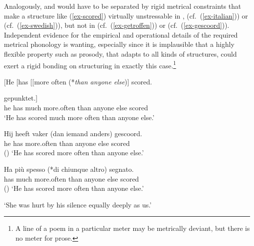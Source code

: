 \documentclass[output=paper
  ,nobabel
  ,uniformtopskip %
]{langscibook}
\begin{document}
\label{ex-muchsmaller}

\label{ex-building}
\zl

\largerpage[2]
\noindent
Analogously,  and  would have to be separated by rigid metrical constraints that make a structure like (\ref{ex-scored}) virtually unstressable in ,  (cf.\ (\ref{ex-italian})) or  (cf.\ (\ref{ex-swedish})), but not in  (cf.\ (\ref{ex-getroffen})) or  (cf.\ (\ref{ex-gescoord})). Independent evidence for the empirical and operational details of the required metrical phonology is wanting, especially since it is implausible that a highly flexible property such as prosody, that adapts to all kinds of structures, could exert a rigid bonding on structuring in exactly this case.\footnote{A line of a poem in a particular meter may be metrically deviant, but there is no meter for prose.}

\eal
\ex\label{ex-scored}
[He [has [[more often (*\emph{than anyone else})] scored.

\ex\label{ex-getroffen}
\gll [Er [hat [[viel öfter (als jeder andere)] gepunktet.] \\
\spacebr{}he \spacebr{}has \hphantom{[[}much more.often \spacebr{}than anyone else scored \\%
\glt `He has scored much more often than anyone else.'

\ex\label{ex-gescoord}
\gll Hij heeft vaker      (dan iemand anders) gescoord. \\
     he  has   more.often \spacebr{}than anyone else scored \\\hfill()
\glt `He has scored more often than anyone else.'

\ex\label{ex-italian}
\gll Ha  più  spesso (*di              chiunque altro)  segnato. \\
     has much more.often  \hphantom{(*}than anyone   else scored \\\hfill()
\glt `He has scored more often than anyone else.'

\ex\label{ex-swedish}
\glt `She was hurt by his silence equally deeply as us.'
\zl
\end{document}
